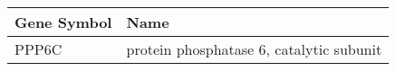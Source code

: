 \begin{tabular}{ll}
\toprule
Gene Symbol &                                     Name \\
\midrule
      PPP6C & protein phosphatase 6, catalytic subunit \\
\bottomrule
\end{tabular}
